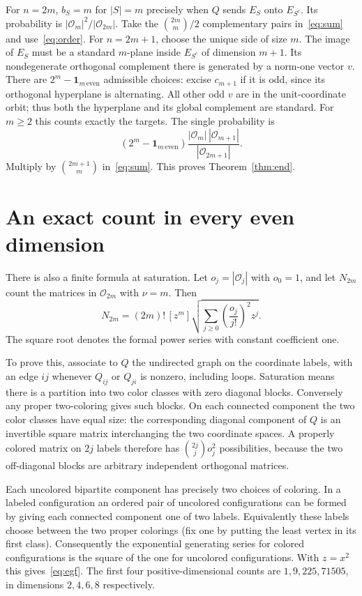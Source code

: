 \documentclass[11pt,letterpaper]{article}
\newcommand{\ind}{\mathbf 1}
\newcommand{\rgp}{\mathcal O}
\begin{document}
For $n=2m$, $b_S=m$ for $|S|=m$ precisely when $Q$ sends $E_S$ onto $E_{S^c}$. Its probability is $|\rgp_m|^2/|\rgp_{2m}|$. Take the $\binom{2m}m/2$ complementary pairs in~\eqref{eq:sum} and use~\eqref{eq:order}. For $n=2m+1$, choose the unique side of size $m$. The image of $E_S$ must be a standard $m$-plane inside $E_{S^c}$ of dimension $m+1$. Its nondegenerate orthogonal complement there is generated by a norm-one vector $v$. There are $2^m-\ind_{m\,\mathrm{even}}$ admissible choices: excise $c_{m+1}$ if it is odd, since its orthogonal hyperplane is alternating. All other odd $v$ are in the unit-coordinate orbit; thus both the hyperplane and its global complement are standard. For $m\ge2$ this counts exactly the targets. The single probability is
\[
 (2^m-\ind_{m\,\mathrm{even}})
       \frac{|\rgp_m|\,|\rgp_{m+1}|}{|\rgp_{2m+1}|}.
\]
Multiply by $\binom{2m+1}m$ in~\eqref{eq:sum}. This proves Theorem~\ref{thm:end}.

\section{An exact count in every even dimension}
There is also a finite formula at saturation. Let $o_j=|\rgp_j|$ with $o_0=1$, and let $N_{2m}$ count the matrices in $\rgp_{2m}$ with $\nu=m$. Then
\begin{equation}\label{eq:egf}
 N_{2m}=(2m)!\,[z^m]\sqrt{\sum_{j\ge0}\left(\frac{o_j}{j!}\right)^2z^j}.
\end{equation}
The square root denotes the formal power series with constant coefficient one.

To prove this, associate to $Q$ the undirected graph on the coordinate labels, with an edge $ij$ whenever $Q_{ij}$ or $Q_{ji}$ is nonzero, including loops. Saturation means there is a partition into two color classes with zero diagonal blocks. Conversely any proper two-coloring gives such blocks. On each connected component the two color classes have equal size: the corresponding diagonal component of $Q$ is an invertible square matrix interchanging the two coordinate spaces. A properly colored matrix on $2j$ labels therefore has $\binom{2j}j o_j^2$ possibilities, because the two off-diagonal blocks are arbitrary independent orthogonal matrices.

Each uncolored bipartite component has precisely two choices of coloring. In a labeled configuration an ordered pair of uncolored configurations can be formed by giving each connected component one of two labels. Equivalently these labels choose between the two proper colorings (fix one by putting the least vertex in its first class). Consequently the exponential generating series for colored configurations is the square of the one for uncolored configurations. With $z=x^2$ this gives~\eqref{eq:egf}. The first four positive-dimensional counts are $1,9,225,71505$, in dimensions $2,4,6,8$ respectively.
\end{document}
